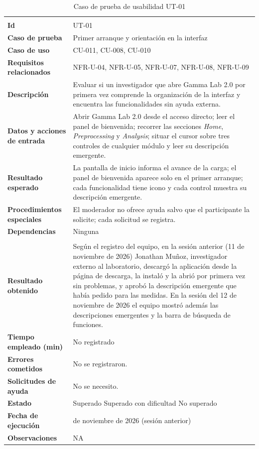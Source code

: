 \documentclass[12pt,letterpaper,oneside]{article}
\DeclareRobustCommand{\_}{\textunderscore\allowbreak}
\newcommand{\fechasesion}{12 de noviembre de 2026}
\newcommand{\fechasesionanterior}{11 de noviembre de 2026}
\newcommand{\casilla}[1]{%
    \fbox{\makebox[1em][c]{#1}}%
}
\begin{document}
\begin{center}
\small
\begin{longtable}{|>{\raggedright\arraybackslash}p{}|>{\raggedright\arraybackslash}p{}|}
\hline
\endfirsthead
\hline
\endhead
\hline
\endfoot
\hline
\caption{Caso de prueba de usabilidad UT-01} \label{tab:ut-01} \\
\endlastfoot
\textbf{Id} & UT-01 \\
\hline
\textbf{Caso de prueba} & Primer arranque y orientación en la interfaz \\
\hline
\textbf{Caso de uso} & CU-011, CU-008, CU-010 \\
\hline
\textbf{Requisitos relacionados} & NFR-U-04, NFR-U-05, NFR-U-07, NFR-U-08, NFR-U-09 \\
\hline
\textbf{Descripción} & Evaluar si un investigador que abre Gamma Lab 2.0 por primera vez comprende la organización de la interfaz y encuentra las funcionalidades sin ayuda externa. \\
\hline
\textbf{Datos y acciones de entrada} & Abrir Gamma Lab 2.0 desde el acceso directo; leer el panel de bienvenida; recorrer las secciones \textit{Home}, \textit{Preprocessing} y \textit{Analysis}; situar el cursor sobre tres controles de cualquier módulo y leer su descripción emergente. \\
\hline
\textbf{Resultado esperado} & La pantalla de inicio informa el avance de la carga; el panel de bienvenida aparece solo en el primer arranque; cada funcionalidad tiene icono y cada control muestra su descripción emergente. \\
\hline
\textbf{Procedimientos especiales} & El moderador no ofrece ayuda salvo que el participante la solicite; cada solicitud se registra. \\
\hline
\textbf{Dependencias} & Ninguna \\
\hline
\multicolumn{2}{|c|}{\textbf{Información para el seguimiento}} \\
\hline
\textbf{Resultado obtenido} & Según el registro del equipo, en la sesión anterior (\fechasesionanterior{}) Jonathan Muñoz, investigador externo al laboratorio, descargó la aplicación desde la página de descarga, la instaló y la abrió por primera vez sin problemas, y aprobó la descripción emergente que había pedido para las medidas. En la sesión del \fechasesion{} el equipo mostró además las descripciones emergentes y la barra de búsqueda de funciones. \\
\hline
\textbf{Tiempo empleado (min)} & No registrado \\
\hline
\textbf{Errores cometidos} & No se registraron. \\
\hline
\textbf{Solicitudes de ayuda} & No se necesito. \\
\hline
\textbf{Estado} & \casilla{x} Superado \qquad \casilla{} Superado con dificultad \qquad \casilla{} No superado \\
\hline
\textbf{Fecha de ejecución} & \fechasesionanterior{} (sesión anterior) \\
\hline
\textbf{Observaciones} & NA \\
\hline
\end{longtable}
\end{center}
\end{document}
